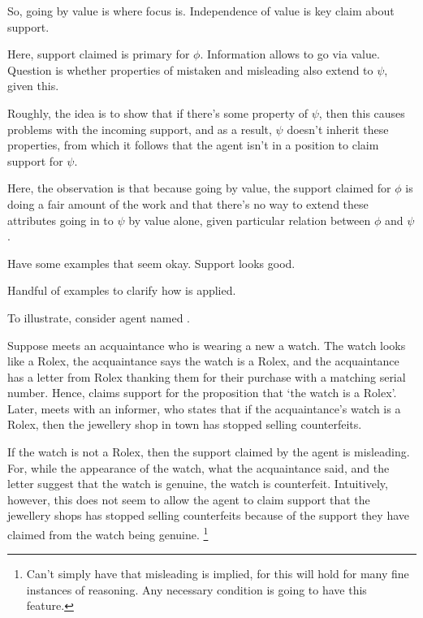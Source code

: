 \begin{note}
  So, going by value is where focus is.
  Independence of value is key claim about support.

  Here, support claimed is primary for \(\phi\).
  Information allows to go via value.
  Question is whether properties of mistaken and misleading also extend to \(\psi\), given this.

  Roughly, the idea is to show that if there's some property of \(\psi\), then this causes problems with the incoming support, and as a result, \(\psi\) doesn't inherit these properties, from which it follows that the agent isn't in a position to claim support for \(\psi\).

  Here, the observation is that because going by value, the support claimed for \(\phi\) is doing a fair amount of the work and that there's no way to extend these attributes going in to \(\psi\) by value alone, given particular relation between \(\phi\) and \(\psi\).
\end{note}

\begin{note}
  Have some examples that seem okay.
  Support looks good.
\end{note}

\begin{note}
  Handful of examples to clarify how \nI{} is applied.
\end{note}

\begin{note}[\nI{} example]
  To illustrate, consider agent named .

  Suppose  meets an acquaintance who is wearing a new a watch.
  The watch looks like a Rolex, the acquaintance says the watch is a Rolex, and the acquaintance has a letter from Rolex thanking them for their purchase with a matching serial number.
  Hence,  claims support for the proposition that `the watch is a Rolex'.
  Later,  meets with an informer, who states that if the acquaintance's watch is a Rolex, then the jewellery shop in town has stopped selling counterfeits.

  If the watch is not a Rolex, then the support claimed by the agent is misleading.
  For, while the appearance of the watch, what the acquaintance said, and the letter suggest that the watch is genuine, the watch is counterfeit.
  Intuitively, however, this does not seem to allow the agent to claim support that the jewellery shops has stopped selling counterfeits because of the support they have claimed from the watch being genuine.\nolinebreak
  \footnote{
    Can't simply have that misleading is implied, for this will hold for many fine instances of reasoning.
    Any necessary condition is going to have this feature.
  }
\end{note}

